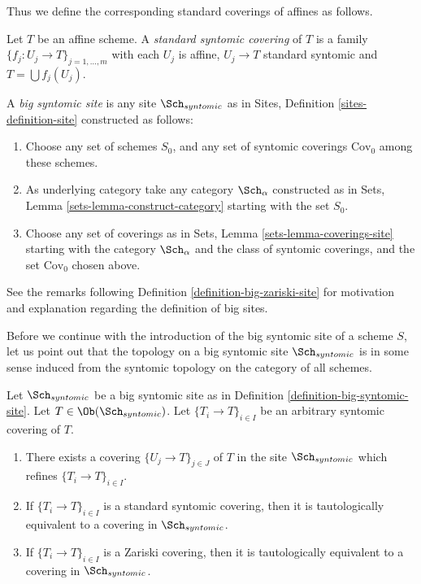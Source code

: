 \noindent
Thus we define the corresponding standard coverings of affines as follows.

\begin{definition}
\label{definition-standard-syntomic}
Let $T$ be an affine scheme. A {\it standard syntomic covering} of $T$ is
a family $\{f_j : U_j \to T\}_{j = 1, \ldots, m}$ with each $U_j$ is
affine, $U_j \to T$ standard syntomic and $T = \bigcup f_j(U_j)$.
\end{definition}

\begin{definition}
\label{definition-big-syntomic-site}
A {\it big syntomic site} is any site $\Sch_{syntomic}$ as in
Sites, Definition \ref{sites-definition-site} constructed as follows:
\begin{enumerate}
\item Choose any set of schemes $S_0$, and any set of syntomic coverings
$\text{Cov}_0$ among these schemes.
\item As underlying category take any category $\Sch_\alpha$
constructed as in Sets, Lemma \ref{sets-lemma-construct-category}
starting with the set $S_0$.
\item Choose any set of coverings as in
Sets, Lemma \ref{sets-lemma-coverings-site} starting with the
category $\Sch_\alpha$ and the class of syntomic coverings,
and the set $\text{Cov}_0$ chosen above.
\end{enumerate}
\end{definition}

\noindent
See the remarks following Definition \ref{definition-big-zariski-site}
for motivation and explanation regarding the definition of big sites.

\medskip\noindent
Before we continue with the introduction of the big syntomic site of
a scheme $S$, let us point out that the topology on a big syntomic site
$\Sch_{syntomic}$ is in some sense induced from the syntomic topology
on the category of all schemes.

\begin{lemma}
\label{lemma-syntomic-induced}
Let $\Sch_{syntomic}$ be a big syntomic site as in
Definition \ref{definition-big-syntomic-site}.
Let $T \in \Ob(\Sch_{syntomic})$.
Let $\{T_i \to T\}_{i \in I}$ be an arbitrary syntomic covering of $T$.
\begin{enumerate}
\item There exists a covering $\{U_j \to T\}_{j \in J}$ of $T$ in the site
$\Sch_{syntomic}$ which refines $\{T_i \to T\}_{i \in I}$.
\item If $\{T_i \to T\}_{i \in I}$ is a standard syntomic covering, then
it is tautologically equivalent to a covering in $\Sch_{syntomic}$.
\item If $\{T_i \to T\}_{i \in I}$ is a Zariski covering, then
it is tautologically equivalent to a covering in $\Sch_{syntomic}$.
\end{enumerate}
\end{lemma}

